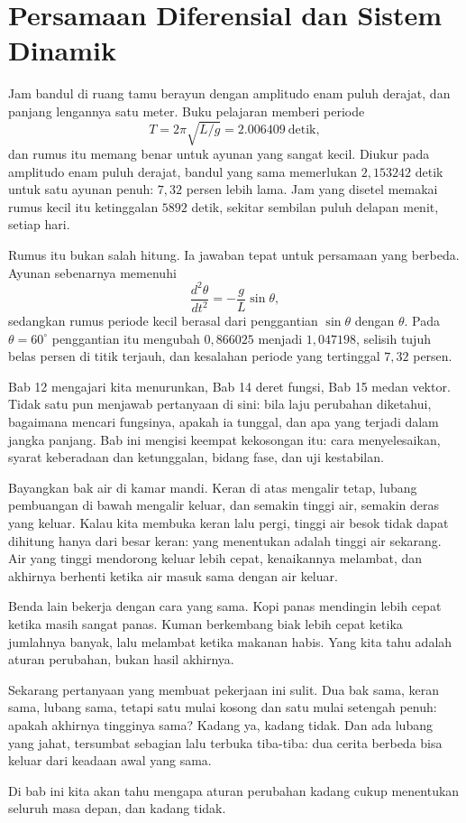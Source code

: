 \chapter{Persamaan Diferensial dan Sistem Dinamik}

Jam bandul di ruang tamu berayun dengan amplitudo enam puluh derajat, dan panjang
lengannya satu meter. Buku pelajaran memberi periode
\[
T=2\pi\sqrt{L/g}=2.006409\ \text{detik},
\]
dan rumus itu memang benar untuk ayunan yang sangat kecil. Diukur pada amplitudo
enam puluh derajat, bandul yang sama memerlukan $2{,}153242$ detik untuk satu ayunan
penuh: $7{,}32$ persen lebih lama. Jam yang disetel memakai rumus kecil itu
ketinggalan $5892$ detik, sekitar sembilan puluh delapan menit, setiap hari.

Rumus itu bukan salah hitung. Ia jawaban tepat untuk persamaan yang berbeda.
Ayunan sebenarnya memenuhi
\[
\frac{d^{2}\theta}{dt^{2}}=-\frac{g}{L}\sin\theta ,
\]
sedangkan rumus periode kecil berasal dari penggantian $\sin\theta$ dengan
$\theta$. Pada $\theta=60^{\circ}$ penggantian itu mengubah $0{,}866025$ menjadi
$1{,}047198$, selisih tujuh belas persen di titik terjauh, dan kesalahan periode
yang tertinggal $7{,}32$ persen. 

Bab 12 mengajari kita menurunkan, Bab 14 deret fungsi, Bab 15 medan vektor.
Tidak satu pun menjawab pertanyaan di sini: bila laju perubahan diketahui,
bagaimana mencari fungsinya, apakah ia tunggal, dan apa yang terjadi dalam jangka
panjang. Bab ini mengisi keempat kekosongan itu: cara menyelesaikan, syarat
keberadaan dan ketunggalan, bidang fase, dan uji kestabilan.

\begin{untukanak}
Bayangkan bak air di kamar mandi. Keran di atas mengalir tetap, lubang pembuangan
di bawah mengalir keluar, dan semakin tinggi air, semakin deras yang keluar.
Kalau kita membuka keran lalu pergi, tinggi air besok tidak dapat dihitung hanya
dari besar keran: yang menentukan adalah tinggi air sekarang. Air yang tinggi
mendorong keluar lebih cepat, kenaikannya melambat, dan akhirnya berhenti ketika
air masuk sama dengan air keluar.

Benda lain bekerja dengan cara yang sama. Kopi panas mendingin lebih cepat ketika
masih sangat panas. Kuman berkembang biak lebih cepat ketika jumlahnya banyak,
lalu melambat ketika makanan habis. Yang kita tahu adalah aturan perubahan, bukan
hasil akhirnya.

Sekarang pertanyaan yang membuat pekerjaan ini sulit. Dua bak sama, keran sama,
lubang sama, tetapi satu mulai kosong dan satu mulai setengah penuh: apakah
akhirnya tingginya sama? Kadang ya, kadang tidak. Dan ada lubang yang jahat,
tersumbat sebagian lalu terbuka tiba-tiba: dua cerita berbeda bisa keluar dari
keadaan awal yang sama.

Di bab ini kita akan tahu mengapa aturan perubahan kadang cukup menentukan
seluruh masa depan, dan kadang tidak.
\end{untukanak}

